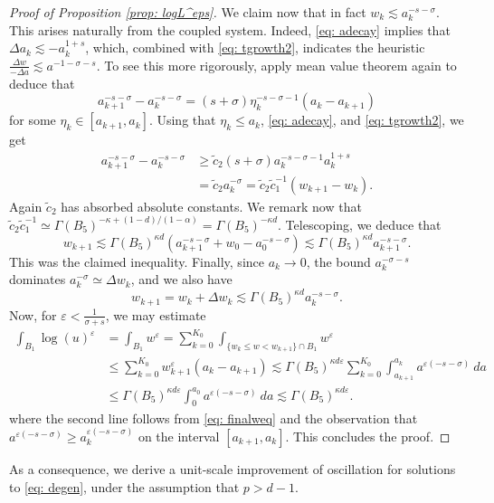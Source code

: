 \documentclass[reqno]{amsart}
\numberwithin{equation}{section}
\numberwithin{equation}{section}
\newcommand{\eps}{\varepsilon}
\newcommand{\ds}{\displaystyle}
\begin{document}
\begin{proof}[Proof of Proposition \ref{prop: logL^eps}]
We claim now that in fact $w_{k} \lesssim a_k^{-s-\sigma}$. This arises naturally from the coupled system. Indeed, \eqref{eq: adecay} implies that $\Delta a_k \lesssim - a_k^{1+s}$, which, combined with \eqref{eq: tgrowth2}, indicates the heuristic $\ds \frac{\Delta w}{-\Delta a} \lesssim a^{-1-\sigma -s}$. To see this more rigorously, apply mean value theorem again to deduce that
$$a_{k+1}^{-s-\sigma} - a_k^{-s-\sigma} = (s+\sigma) \eta_k^{-s-\sigma -1}(a_k-a_{k+1})$$
for some $\eta_k \in [a_{k+1}, a_k]$. Using that $\eta_k \le a_k$, \eqref{eq: adecay}, and \eqref{eq: tgrowth2}, we get
\begin{align}
a_{k+1}^{-s-\sigma} - a_k^{-s-\sigma } &\ge \tilde{c}_2 (s+\sigma)a_k^{-s-\sigma -1} a_k^{1+s}\\
&= \tilde{c}_2 a_k^{-\sigma} = \tilde{c}_2 \tilde{c}_1^{-1}(w_{k+1}-w_k).
\end{align}
Again $\tilde{c}_2$ has absorbed absolute constants. We remark now that $\tilde{c}_2\tilde{c}_1^{-1} \simeq \Gamma(B_5)^{-\kappa + (1-d)/(1-\alpha)} = \Gamma(B_5)^{-\kappa d}$. 
Telescoping, we deduce that 
$$w_{k+1} \lesssim \Gamma(B_5)^{\kappa d}(a_{k+1}^{-s-\sigma} + w_0 - a_0^{-s-\sigma}) \lesssim \Gamma(B_5)^{\kappa d} a_{k+1}^{-s-\sigma}.$$ This was the claimed inequality. Finally, since $a_k \to 0$, the bound $a_k^{-\sigma -s}$ dominates $a_k^{-\sigma} \simeq \Delta w_k$, and we also have\begin{equation}
\label{eq: finalweq}
w_{k+1} = w_k + \Delta w_k \lesssim \Gamma(B_5)^{\kappa d} a_k^{-s-\sigma}.
\end{equation}
Now, for $\ds \eps < \frac{1}{\sigma +s}$, we may estimate
\begin{align}
    \int_{B_1} \log(u)^\eps  &= \int_{B_1} w^\eps = \sum_{k=0}^{K_0}\int_{ \{w_k \le w < w_{k+1}\}\cap B_1} w^\eps  \\
    &\le \sum_{k=0}^{K_0}w_{k+1}^\eps (a_k - a_{k+1})  \lesssim \Gamma(B_5)^{\kappa d \eps}\sum_{k=0}^{K_0} \int_{a_{k+1}}^{a_k} a^{\eps(-s-\sigma)} \ da \\
    & \le \Gamma(B_5)^{\kappa d \eps} \int_0^{a_0} a^{\eps(-s-\sigma)} \ da \lesssim \Gamma(B_5)^{\kappa d \eps}.
\end{align}
where the second line follows from \eqref{eq: finalweq} and the observation that $a^{\eps(-s-\sigma)} \ge a_k^{\eps(-s-\sigma)}$ on the interval $[a_{k+1}, a_k]$. This concludes the proof. 
\end{proof}
As a consequence, we derive a unit-scale improvement of oscillation for solutions to \eqref{eq: degen}, under the assumption that $p>d-1$. 
\end{document}
